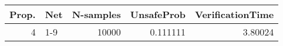 \begin{tabular}{rlrrr}
\hline
   Prop. & Net   &   N-samples &   UnsafeProb &   VerificationTime \\
\hline
       4 & 1-9   &       10000 &     0.111111 &            3.80024 \\
\hline
\end{tabular}
